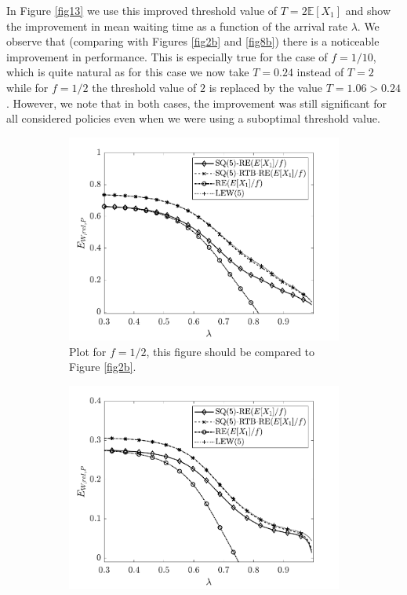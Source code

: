 \documentclass[12pt]{report}
\newcommand{\E}{\mathbb{E}}
\begin{document}
In Figure \ref{fig13} we use this improved threshold value of $T=2\E[X_1]$ and show the improvement in mean waiting time as a function of the arrival rate $\lambda$. We observe that (comparing with Figures \ref{fig2b} and \ref{fig8b}) there is a noticeable improvement in performance. This is especially true for the case of $f=1/10$, which is quite natural as for this case we now take $T=0.24$ instead of $T=2$ while for $f=1/2$ the threshold value of $2$ is replaced by the value $T=1.06 > 0.24$. However, we note that in both cases, the improvement was still significant for all considered policies even when we were using a suboptimal threshold value.
\begin{figure}[t]
\begin{center}
\begin{subfigure}{0.43\textwidth}
\centering
\captionsetup{width=.8\linewidth}
\includegraphics[width=1\linewidth]{figures/Chapter7/fig13a.pdf}
\caption{Plot for $f=1/2$, this figure should be compared to Figure \ref{fig2b}.}
\label{fig13a}
\end{subfigure}
\begin{subfigure}{.43\textwidth}
\centering
\captionsetup{width=.8\linewidth}
\includegraphics[width=1\linewidth]{figures/Chapter7/fig13b.pdf}

\end{subfigure}
\end{center}
\end{figure}
\end{document}

